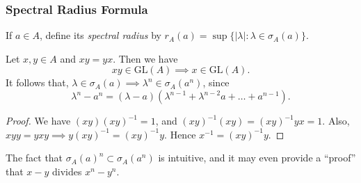 
\subsubsection{Spectral Radius Formula}

\begin{definition}
	\label{defn:SpectralRadius}
	If $a \in A$, define its \textit{spectral radius} by $r_A(a) = \sup \{|\lambda| : \lambda \in \sigma_A(a)\} $.
\end{definition}

\begin{lemma}
	\label{lem:ProductInv}
	Let $x, y \in A$ and $x y = y x$. Then we have
	\[
		x y \in \text{GL}(A) \implies x \in \text{GL}(A)
	.\] 
	It follows that, $\lambda \in \sigma_A(a) \implies \lambda^n \in  \sigma_A(a^n)$, since
	\[
		\lambda^n - a^n = (\lambda - a) \left( \lambda^{n - 1} + \lambda^{n - 2} a + \ldots + a^{n - 1} \right) 
	.\] 
\end{lemma}
\begin{proof}
	We have $(xy) (xy)^{-1} = 1$, and $(xy)^{-1} (xy) = (xy)^{-1} y x =  1$. Also, $x y y = y x y \implies y (xy)^{-1} = (xy)^{-1} y$. Hence $x^{-1} = (xy)^{-1} y$.
\end{proof}
\begin{remark}
	The fact that $\sigma_A(a)^n \subset \sigma_A(a^n)$ is intuitive, and it may even provide a ``proof'' that $x - y$ divides $x^n - y^n$.
\end{remark}


